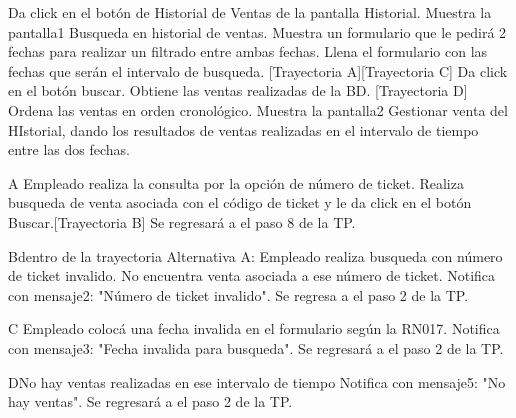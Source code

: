 
\begin{UCtrayectoria}
		
	\UCpaso [\UCactor] Da click en el botón de Historial de Ventas de la pantalla Historial. 
	\UCpaso [\UCsist] Muestra la pantalla1 Busqueda en historial de ventas.
	\UCpaso [\UCsist] Muestra un formulario que le pedirá 2 fechas para realizar un filtrado entre ambas fechas.
	\UCpaso [\UCactor] Llena el formulario con las fechas que serán el intervalo de busqueda. [Trayectoria A][Trayectoria C]
	\UCpaso [\UCactor] Da click en el botón buscar. 
	\UCpaso [\UCsist] Obtiene las ventas realizadas de la BD. [Trayectoria D]
	\UCpaso [\UCsist] Ordena las ventas en orden cronológico. 
	\UCpaso [\UCsist] Muestra la pantalla2 Gestionar venta del HIstorial, dando los resultados de ventas realizadas en el intervalo de tiempo entre las dos fechas.
	
	
\end{UCtrayectoria}



\begin{UCtrayectoriaA}{A}{ Empleado realiza la consulta por la opción de número de ticket.}
	\UCpaso [\UCactor] Realiza busqueda de venta asociada con el código de ticket y le da click en el botón Buscar.[Trayectoria B]
	\UCpaso [\UCsist] Se regresará a el paso 8 de la TP.
\end{UCtrayectoriaA}
\begin{UCtrayectoriaA}{B}{dentro de la trayectoria Alternativa A: Empleado realiza busqueda con número de ticket invalido.}
	\UCpaso [\UCsist] No encuentra venta asociada a ese número de ticket.
	\UCpaso [\UCsist] Notifica con mensaje2: "Número de ticket invalido".
	\UCpaso [\UCsist] Se regresa a el paso 2 de la TP.
\end{UCtrayectoriaA}
\begin{UCtrayectoriaA}{C}{ Empleado colocá una fecha invalida en el formulario según la RN017.}
	\UCpaso [\UCsist] Notifica con mensaje3: "Fecha invalida para busqueda".
	\UCpaso [\UCsist] Se regresará a el paso 2 de la TP.
\end{UCtrayectoriaA}
\begin{UCtrayectoriaA}{D}{No hay ventas realizadas en ese intervalo de tiempo}
	\UCpaso [\UCsist] Notifica con mensaje5: "No hay ventas".
	\UCpaso [\UCsist] Se regresará a el paso 2 de la TP.
\end{UCtrayectoriaA}

